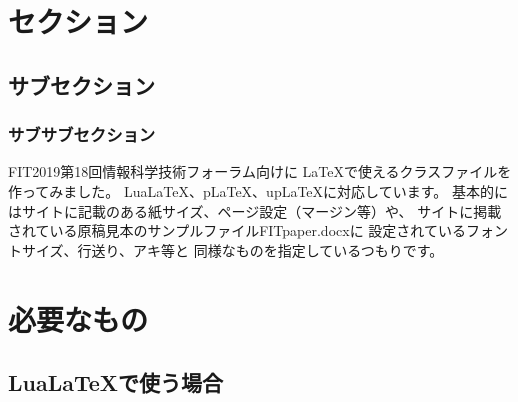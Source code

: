 \documentclass{FITpaper}
\begin{document}
\maketitle

\section{セクション}
\subsection{サブセクション}
\subsubsection{サブサブセクション}

FIT2019第18回情報科学技術フォーラム\cite{fit2019}向けに
\LaTeX で使えるクラスファイル\cite{fitpaper-class}を作ってみました。
Lua\LaTeX 、p\LaTeX 、up\LaTeX に対応しています。
基本的にはサイトに記載のある紙サイズ、ページ設定（マージン等）や、
サイトに掲載されている原稿見本のサンプルファイルFITpaper.docxに
設定されているフォントサイズ、行送り、アキ等と
同様なものを指定しているつもりです。

\section{必要なもの}

\subsection{Lua\LaTeX で使う場合}
\end{document}
